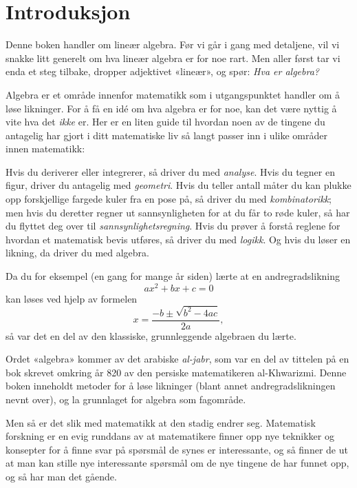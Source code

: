 

\chapter*{Introduksjon}
\label{ch:introduksjon}

Denne boken handler om lineær algebra.
Før vi går i gang med detaljene,
vil vi snakke litt generelt om hva lineær algebra er for noe rart.
Men aller først tar vi enda et steg tilbake,
dropper adjektivet «lineær»,
og spør:
\textit{Hva er algebra?}

Algebra er et område innenfor matematikk som i utgangspunktet handler
om å løse likninger.  For å få en idé om hva algebra er for noe, kan
det være nyttig å vite hva det \emph{ikke} er.  Her er en liten guide
til hvordan noen av de tingene du antagelig har gjort i ditt
matematiske liv så langt passer inn i ulike områder innen matematikk:

Hvis du deriverer eller integrerer, så driver du med \emph{analyse}.
Hvis du tegner en figur, driver du antagelig med \emph{geometri}.
Hvis du teller antall måter du kan plukke opp forskjellige fargede
kuler fra en pose på, så driver du med \emph{kombinatorikk}; men hvis
du deretter regner ut sannsynligheten for at du får to røde kuler, så
har du flyttet deg over til \emph{sannsynlighetsregning}.  Hvis du
prøver å forstå reglene for hvordan et matematisk bevis utføres, så
driver du med \emph{logikk}.  Og hvis du løser en likning, da driver
du med algebra.

\smallskip

Da du for eksempel (en gang for mange år siden) lærte at en
andregradslikning
\[
ax^2 + bx + c = 0
\]
kan løses ved hjelp av formelen
\[
x = \frac{-b \pm \sqrt{b^2 - 4ac}}{2a},
\]
så var det en del av den klassiske, grunnleggende algebraen du lærte.

\smallskip

Ordet «algebra» kommer av det arabiske \emph{al-jabr}, som var en del
av tittelen på en bok skrevet omkring år 820 av den persiske
matematikeren al-Khwarizmi.  Denne boken inneholdt metoder for å løse
likninger (blant annet andregradslikningen nevnt over), og la
grunnlaget for algebra som fagområde.

Men så er det slik med matematikk at den stadig endrer seg.
Matematisk forskning er en evig runddans av at matematikere finner opp
nye teknikker og konsepter for å finne svar på spørsmål de synes er
interessante, og så finner de ut at man kan stille nye interessante
spørsmål om de nye tingene de har funnet opp, og så har man det
gående.

